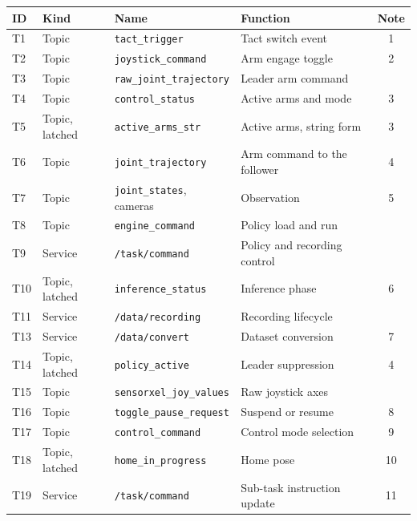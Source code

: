 \documentclass[11pt,a4paper]{article}
\begin{document}
{\small
\begin{longtable}{@{}llllc@{}}
\toprule
\textbf{ID} & \textbf{Kind} & \textbf{Name} & \textbf{Function} & \textbf{Note}\\
\midrule
\endhead
T1  & Topic          & \texttt{tact\_trigger}          & Tact switch event            & 1\\
T2  & Topic          & \texttt{joystick\_command}      & Arm engage toggle            & 2\\
T3  & Topic          & \texttt{raw\_joint\_trajectory} & Leader arm command           & \\
T4  & Topic          & \texttt{control\_status}        & Active arms and mode         & 3\\
T5  & Topic, latched & \texttt{active\_arms\_str}      & Active arms, string form     & 3\\
T6  & Topic          & \texttt{joint\_trajectory}      & Arm command to the follower  & 4\\
T7  & Topic          & \texttt{joint\_states}, cameras & Observation                  & 5\\
T8  & Topic          & \texttt{engine\_command}        & Policy load and run          & \\
T9  & Service        & \texttt{/task/command}          & Policy and recording control & \\
T10 & Topic, latched & \texttt{inference\_status}      & Inference phase              & 6\\
T11 & Service        & \texttt{/data/recording}        & Recording lifecycle          & \\
T13 & Service        & \texttt{/data/convert}          & Dataset conversion           & 7\\
T14 & Topic, latched & \texttt{policy\_active}         & Leader suppression           & 4\\
T15 & Topic          & \texttt{sensorxel\_joy\_values} & Raw joystick axes            & \\
T16 & Topic          & \texttt{toggle\_pause\_request} & Suspend or resume            & 8\\
T17 & Topic          & \texttt{control\_command}       & Control mode selection       & 9\\
T18 & Topic, latched & \texttt{home\_in\_progress}     & Home pose                    & 10\\
T19 & Service        & \texttt{/task/command}          & Sub-task instruction update  & 11\\
\bottomrule
\end{longtable}}
\end{document}
